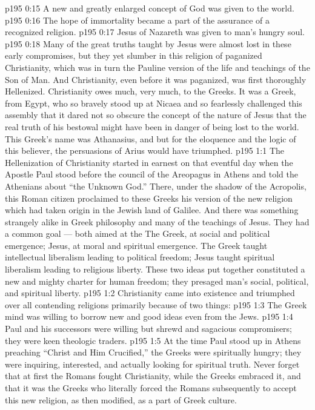\vs p195 0:15 \bibnobreakspace A new and greatly enlarged concept of God was given to the world.
\vs p195 0:16 \bibnobreakspace The hope of immortality became a part of the assurance of a recognized religion.
\vs p195 0:17 \bibnobreakspace Jesus of Nazareth was given to man’s hungry soul.
\vs p195 0:18 \pc Many of the great truths taught by Jesus were almost lost in these early compromises, but they yet slumber in this religion of paganized Christianity, which was in turn the Pauline version of the life and teachings of the Son of Man. And Christianity, even before it was paganized, was first thoroughly Hellenized. Christianity owes much, very much, to the Greeks. It was a Greek, from Egypt, who so bravely stood up at Nicaea and so fearlessly challenged this assembly that it dared not so obscure the concept of the nature of Jesus that the real truth of his bestowal might have been in danger of being lost to the world. This Greek’s name was Athanasius, and but for the eloquence and the logic of this believer, the persuasions of Arius would have triumphed.
\vs p195 1:1 The Hellenization of Christianity started in earnest on that eventful day when the Apostle Paul stood before the council of the Areopagus in Athens and told the Athenians about “the Unknown God.” There, under the shadow of the Acropolis, this Roman citizen proclaimed to these Greeks his version of the new religion which had taken origin in the Jewish land of Galilee. And there was something strangely alike in Greek philosophy and many of the teachings of Jesus. They had a common goal --- both aimed at the  The Greek, at social and political emergence; Jesus, at moral and spiritual emergence. The Greek taught intellectual liberalism leading to political freedom; Jesus taught spiritual liberalism leading to religious liberty. These two ideas put together constituted a new and mighty charter for human freedom; they presaged man’s social, political, and spiritual liberty.
\vs p195 1:2 Christianity came into existence and triumphed over all contending religions primarily because of two things:
\vs p195 1:3 \bibnobreakspace The Greek mind was willing to borrow new and good ideas even from the Jews.
\vs p195 1:4 \bibnobreakspace Paul and his successors were willing but shrewd and sagacious compromisers; they were keen theologic traders.
\vs p195 1:5 \pc At the time Paul stood up in Athens preaching “Christ and Him Crucified,” the Greeks were spiritually hungry; they were inquiring, interested, and actually looking for spiritual truth. Never forget that at first the Romans fought Christianity, while the Greeks embraced it, and that it was the Greeks who literally forced the Romans subsequently to accept this new religion, as then modified, as a part of Greek culture.
